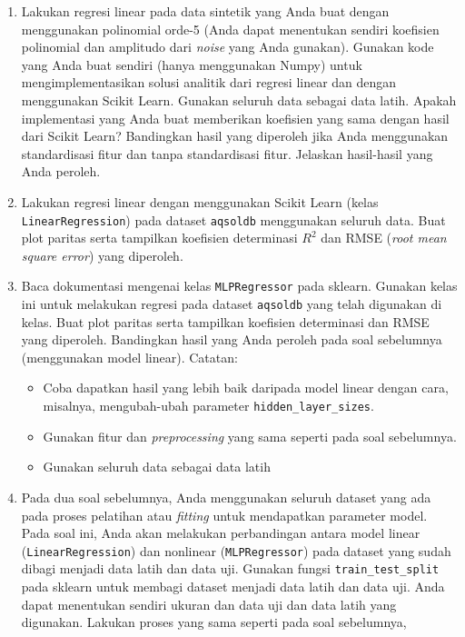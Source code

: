 \documentclass[a4paper,11pt]{article} %
\newcommand{\pyinline}[1]{\texttt{#1}}
\begin{document}
\begin{enumerate}
%
%
\item Lakukan regresi linear pada data sintetik yang Anda buat dengan
menggunakan polinomial orde-5 (Anda dapat menentukan sendiri koefisien
polinomial dan amplitudo dari \textit{noise} yang Anda gunakan).
Gunakan kode yang Anda buat sendiri (hanya menggunakan Numpy)
untuk mengimplementasikan
solusi analitik dari regresi linear dan dengan menggunakan Scikit Learn.
Gunakan seluruh data sebagai data latih.
Apakah implementasi yang Anda buat memberikan
koefisien yang sama dengan hasil dari Scikit Learn? Bandingkan hasil yang diperoleh
jika Anda menggunakan standardisasi fitur dan tanpa standardisasi fitur. Jelaskan
hasil-hasil yang Anda peroleh.
%
%
\item Lakukan regresi linear dengan menggunakan Scikit Learn (kelas
\pyinline{LinearRegression}) pada dataset
\texttt{aqsoldb} menggunakan seluruh data. Buat plot paritas serta tampilkan
koefisien determinasi $R^{2}$ dan RMSE (\textit{root mean square error})
yang diperoleh.
%
%
\item Baca dokumentasi mengenai kelas \texttt{MLPRegressor} pada sklearn.
Gunakan kelas ini untuk melakukan regresi pada dataset \texttt{aqsoldb}
yang telah digunakan di kelas.
Buat plot paritas serta tampilkan
koefisien determinasi dan RMSE yang diperoleh. Bandingkan hasil yang Anda peroleh pada soal
sebelumnya (menggunakan model linear).
Catatan:
  \begin{itemize}
  \item Coba dapatkan hasil yang lebih baik daripada model linear dengan
  cara, misalnya, mengubah-ubah parameter \pyinline{hidden_layer_sizes}.
  \item Gunakan fitur dan \textit{preprocessing} yang sama seperti pada
  soal sebelumnya.
  \item Gunakan seluruh data sebagai data latih
  \end{itemize}
%
%
\item Pada dua soal sebelumnya, Anda menggunakan seluruh dataset yang ada pada
proses pelatihan atau \textit{fitting} untuk mendapatkan parameter model.
Pada soal ini, Anda akan melakukan perbandingan antara model linear
(\pyinline{LinearRegression}) dan nonlinear (\pyinline{MLPRegressor}) pada
dataset yang sudah dibagi menjadi data latih dan data uji. Gunakan
fungsi \pyinline{train_test_split} pada sklearn untuk membagi dataset menjadi
data latih dan data uji. Anda dapat menentukan sendiri ukuran dan data uji dan
data latih yang digunakan. Lakukan proses yang sama seperti pada soal sebelumnya,

\end{enumerate}
\end{document}
